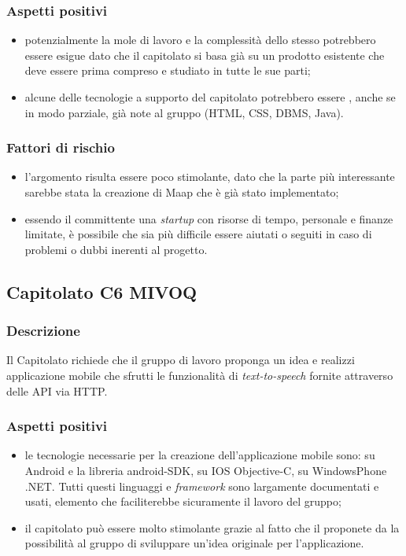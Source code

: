 \documentclass[12pt,a4paper]{article}
\begin{document}
\subsubsection{Aspetti positivi}
\begin{itemize}
\item potenzialmente la mole di lavoro e la complessità dello stesso potrebbero essere esigue dato che il capitolato si basa già su un prodotto esistente che deve essere prima compreso e studiato in tutte le sue parti;

\item alcune delle tecnologie a supporto del capitolato potrebbero essere , anche se in modo parziale, già note al gruppo (HTML, CSS, DBMS, Java).
\end{itemize}

\subsubsection{Fattori di rischio}
\begin{itemize}
\item l'argomento risulta essere poco stimolante, dato che la parte più interessante sarebbe stata la creazione di Maap che è già stato implementato;

\item essendo il committente una \textit{startup} con risorse di tempo, personale e finanze limitate, è possibile che sia più difficile essere aiutati o seguiti in caso di problemi o dubbi inerenti al progetto.
\end{itemize}

\newpage
\subsection{Capitolato C6 MIVOQ}
\subsubsection{Descrizione}

Il Capitolato richiede che il gruppo di lavoro proponga un idea e realizzi applicazione mobile che sfrutti le funzionalità di \textit{text-to-speech} fornite attraverso delle API via HTTP.

\subsubsection{Aspetti positivi}
\begin{itemize}
 \item le tecnologie necessarie per la creazione dell'applicazione mobile sono: su Android  e la libreria android-SDK, su IOS Objective-C, su WindowsPhone .NET. Tutti questi linguaggi e \textit{framework} sono largamente documentati e usati, elemento che faciliterebbe sicuramente il lavoro del gruppo;
 \item il capitolato può essere molto stimolante grazie al fatto che il proponete da la possibilità al gruppo di sviluppare un'idea originale per l'applicazione. 
\end{itemize}
\end{document}
